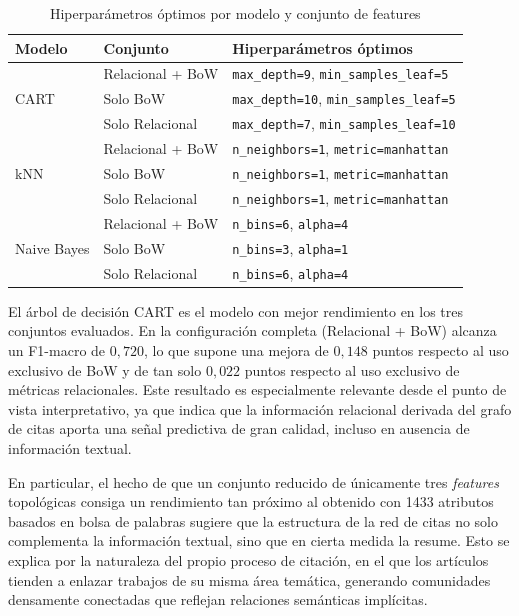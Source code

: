 \documentclass[conference,a4paper]{IEEEtran}
\begin{document}
\begin{table}[htbp]
  \caption{Hiperparámetros óptimos por modelo y conjunto de features}
  \label{tab:hiperparametros}
  \centering
  \begin{tabular}{llp{4.5cm}}
    \toprule
    Modelo & Conjunto & Hiperparámetros óptimos \\
    \midrule
    \multirow{3}{*}{CART}
      & Relacional + BoW & \texttt{max\_depth=9}, \texttt{min\_samples\_leaf=5} \\
      & Solo BoW         & \texttt{max\_depth=10}, \texttt{min\_samples\_leaf=5} \\
      & Solo Relacional  & \texttt{max\_depth=7}, \texttt{min\_samples\_leaf=10} \\
    \midrule
    \multirow{3}{*}{kNN}
      & Relacional + BoW & \texttt{n\_neighbors=1}, \texttt{metric=manhattan} \\
      & Solo BoW         & \texttt{n\_neighbors=1}, \texttt{metric=manhattan} \\
      & Solo Relacional  & \texttt{n\_neighbors=1}, \texttt{metric=manhattan} \\
    \midrule
    \multirow{3}{*}{Naive Bayes}
      & Relacional + BoW & \texttt{n\_bins=6}, \texttt{alpha=4} \\
      & Solo BoW         & \texttt{n\_bins=3}, \texttt{alpha=1} \\
      & Solo Relacional  & \texttt{n\_bins=6}, \texttt{alpha=4} \\
    \bottomrule
  \end{tabular}
\end{table}

El árbol de decisión CART es el modelo con mejor rendimiento en los tres conjuntos evaluados. 
En la configuración completa (Relacional + BoW) alcanza un F1-macro de $0{,}720$, lo que supone una mejora de $0{,}148$ puntos respecto al 
uso exclusivo de BoW y de tan solo $0{,}022$ puntos respecto al uso exclusivo de métricas relacionales. Este resultado es especialmente 
relevante desde el punto de vista interpretativo, ya que indica que la información relacional derivada del grafo de citas aporta una señal 
predictiva de gran calidad, incluso en ausencia de información textual.

En particular, el hecho de que un conjunto reducido de únicamente tres \emph{features} 
topológicas consiga un rendimiento tan próximo al obtenido con 1433 atributos basados en bolsa de palabras sugiere que la 
estructura de la red de citas no solo complementa la información textual, sino que en cierta medida la resume. Esto se explica por la 
naturaleza del propio proceso de citación, en el que los artículos tienden a enlazar trabajos de su misma área temática, generando 
comunidades densamente conectadas que reflejan relaciones semánticas implícitas.
\end{document}
